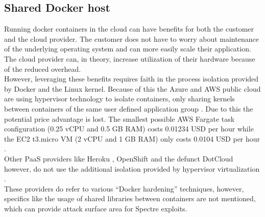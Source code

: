 \documentclass[conference,compsoc,final,a4paper]{IEEEtran}
\begin{document}
\subsection{Shared Docker host}
Running docker containers in the cloud can have benefits for both the customer and the cloud provider. The customer does not have to worry about maintenance
of the underlying operating system and can more easily scale their application. The cloud provider can, in theory, increase utilization of their hardware
because of the reduced overhead. \\
However, leveraging these benefits requires faith in the process isolation provided by Docker and the Linux kernel. Because of this the Azure and \ac{AWS} public
cloud are using hypervisor technology to isolate containers, only sharing kernels between containers of the same user defined application group
\cite{fargateIsolation, azureIsolation}. Due to this the
potential price advantage is lost. The smallest possible \ac{AWS} Fargate task configuration (0.25 vCPU and 0.5 GB RAM) costs 0.01234 USD per hour \cite{fargatePricing}
while the EC2 t3.micro VM (2 vCPU and 1 GB RAM) only costs 0.0104 USD per hour \cite{ec2Pricing}. \\
Other \ac{PaaS} providers like
Heroku \cite{herokuIsolation}, OpenShift \cite{openshiftIsolation} and the defunct DotCloud however, do not use the additional isolation provided
by hypervisor virtualization \cite{zhang2014cross}. \\
These providers do refer to various \enquote{Docker hardening} techniques, however, specifics like the usage of
shared libraries between containers are not mentioned, which can provide attack surface area for Spectre exploits. \cite{retpolineTurner}
\end{document}
